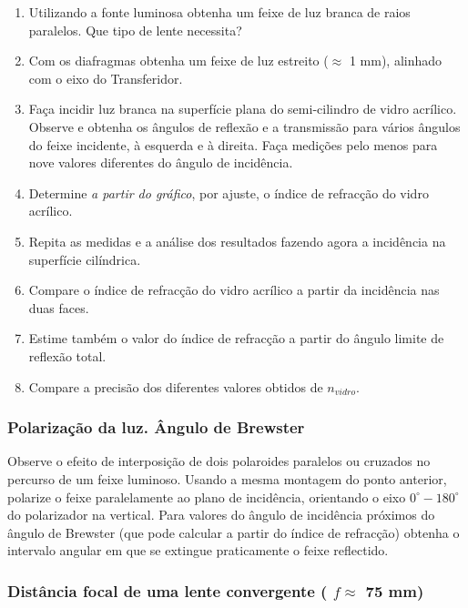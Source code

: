 \documentclass[a4paper,12pt]{article}      %
\begin{document}
\begin{enumerate}
\item Utilizando a  fonte  luminosa  obtenha  um  feixe  de  luz  branca  de  raios  paralelos. Que tipo de lente necessita?
\item Com os diafragmas obtenha um feixe de luz estreito ($\approx$ 1 mm), alinhado com o eixo do Transferidor.
\item Faça  incidir  luz  branca  na  superfície  plana  do  semi-cilindro  de  vidro  acrílico.  Observe  e obtenha os ângulos de 
reflexão e a transmissão para vários ângulos do feixe incidente, à 
esquerda e à direita.  Faça  medições  pelo  menos  para  nove  valores  diferentes  do 
ângulo de incidência.
\item  Determine \emph{a partir do gráfico}, por ajuste, o índice de refracção do vidro acrílico.  
\item Repita  as  medidas  e  a  análise  dos  resultados  fazendo  agora  a  incidência  na  superfície cilíndrica. 
\item  Compare o índice de refracção do vidro acrílico a partir da incidência nas duas faces. 
\item Estime também o valor do índice de refracção a partir do ângulo limite de reflexão total. 
\item  Compare a precisão dos diferentes valores obtidos de $n_{vidro}$. 
\end{enumerate}

\subsubsection{\sf Polarização da luz. Ângulo de Brewster}
Observe o efeito de interposição de dois polaroides paralelos ou cruzados no percurso de um feixe luminoso. 
Usando a mesma montagem do ponto anterior, polarize o feixe  paralelamente ao plano
de incidência, orientando o eixo $0^\circ-180^\circ$ do polarizador na vertical. Para valores do ângulo de incidência próximos 
do  ângulo  de  Brewster  (que  pode  calcular  a  partir  do  índice de refracção) obtenha   o  intervalo 
angular em que se extingue praticamente o feixe reflectido. 

\subsubsection{\sf   Distância focal de uma lente convergente ( $f  \approx$ 75 mm) }
 
\end{document}
